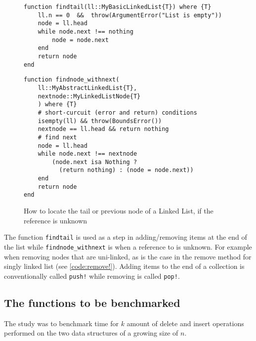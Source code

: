 \documentclass[a4paper, 11pt]{article}
\begin{document}
    \begin{figure}[H]
    \centering
    \begin{verbatim}
function findtail(ll::MyBasicLinkedList{T}) where {T}
    ll.n == 0  &&  throw(ArgumentError("List is empty"))
    node = ll.head
    while node.next !== nothing
        node = node.next
    end
    return node
end
    \end{verbatim}
    \begin{verbatim}
function findnode_withnext(
    ll::MyAbstractLinkedList{T}, 
    nextnode::MyLinkedListNode{T}
    ) where {T}
    # short-curcuit (error and return) conditions
    isempty(ll) && throw(BoundsError()) 
    nextnode == ll.head && return nothing
    # find next
    node = ll.head 
    while node.next !== nextnode
        (node.next isa Nothing ? 
          (return nothing) : (node = node.next))
    end
    return node
end
    \end{verbatim}
    \caption{How to locate the tail or previous node of a Linked List, 
    if the reference is unknown}
    \label{code:findtail}
    \end{figure}
    The function \texttt{findtail} is used as a step in
    adding/removing items at the end of the list 
    while \texttt{findnode_withnext} is when a reference to is unknown.
    For example when removing nodes that are uni-linked, as is the case in 
    the remove method for singly linked list (see \autoref{code:remove!}). 
    Adding items to the end of a collection 
    is conventionally called \texttt{push!} while removing is called
    \texttt{pop!}. 
    \clearpage 
    \subsection*{The functions to be benchmarked}
    The study was to benchmark time for $k$ amount of delete and insert operations performed on 
    the two data structures of a growing size of $n$. 
    
\end{document}
